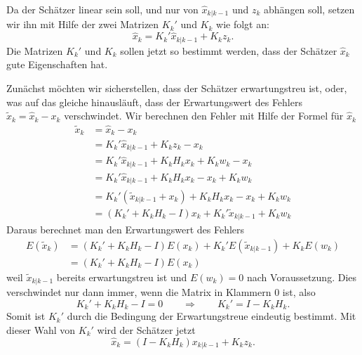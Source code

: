 Da der Schätzer linear sein soll, und nur von $\hat x_{k|k-1}$ und $z_{k}$
abhängen soll, setzen wir ihn mit Hilfe der zwei Matrizen $K_k'$ und $K_k$
wie folgt an:
\[
\hat x_{k}=K_{k}' \hat x_{k|k-1}+K_{k} z_{k}.
\]
Die Matrizen $K_{k}'$ und $K_{k}$ sollen jetzt so bestimmt werden, dass der Schätzer
$\hat x_{k}$ gute Eigenschaften hat.

Zunächst möchten wir sicherstellen, dass der Schätzer erwartungstreu ist,
oder, was auf das gleiche hinausläuft, dass der Erwartungswert des Fehlers
$\tilde x_{k}=\hat x_{k}-x_{k}$ verschwindet.
Wir berechnen den Fehler
mit Hilfe der Formel für $\hat x_{k}$
\begin{align*}
\tilde x_{k}&=\hat x_{k}-x_{k}\\
&=K_{k}'\hat x_{k|k-1}+K_{k}z_{k}-x_{k}\\
&=K_{k}'\hat x_{k|k-1}+K_{k}H_{k}x_{k} + K_{k}w_{k}-x_{k}\\
&=K_{k}'\hat x_{k|k-1}+K_{k}H_{k}x_{k} -x_{k} + K_{k}w_{k}\\
&=K_{k}'(\tilde x_{k|k-1}+x_{k})+K_{k}H_{k}x_{k}-x_{k}+K_{k}w_{k}\\
&=(K_{k}'+K_{k}H_{k}-I)x_{k}+K_{k}'\tilde x_{k|k-1}+K_kw_k
\end{align*}
Daraus berechnet man den Erwartungswert des Fehlers
\begin{align*}
E(\tilde x_{k})&=(K_{k}'+K_{k}H_{k}-I)E(x_{k})+K_{k}'E(\tilde x_{k|k-1})+K_{k}E(w_{k})\\
&=(K_{k}'+K_{k}H_{k}-I)E(x_{k})
\end{align*}
weil $\tilde x_{k|k-1}$ bereits erwartungstreu ist und $E(w_{k})=0$ nach Voraussetzung.
Dies verschwindet nur dann immer, wenn die Matrix in Klammern $0$ ist,
also
\[
K_{k}'+K_{k}H_{k}-I=0\qquad\Rightarrow\qquad K_{k}'=I-K_{k}H_{k}.
\]
Somit ist $K_{k}'$ durch die Bedingung der Erwartungstreue eindeutig bestimmt.
Mit dieser Wahl von $K_{k}'$ wird der Schätzer jetzt
\[
\hat x_{k}=(I-K_{k}H_{k})x_{k|k-1}+K_{k}z_{k}.
\]

